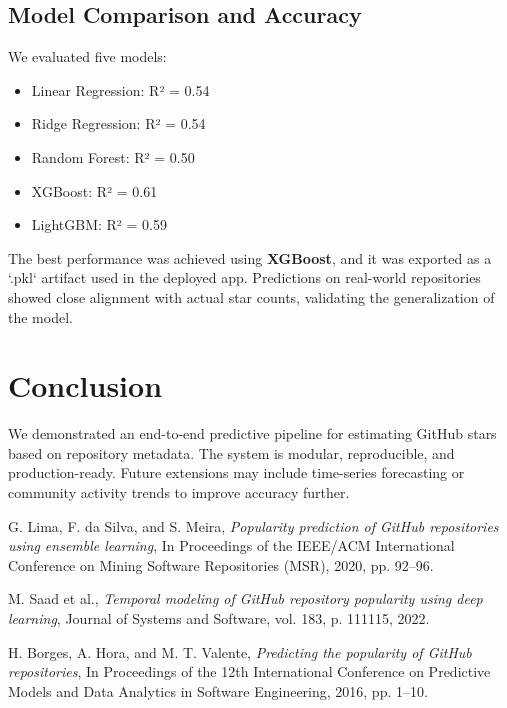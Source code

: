\documentclass[12pt,a4paper]{article}
\begin{document}
\subsection{Model Comparison and Accuracy}
We evaluated five models:
\begin{itemize}[noitemsep]
    \item Linear Regression: R² = 0.54
    \item Ridge Regression: R² = 0.54
    \item Random Forest: R² = 0.50
    \item XGBoost: R² = 0.61
    \item LightGBM: R² = 0.59
\end{itemize}

The best performance was achieved using \textbf{XGBoost}, and it was exported as a `.pkl` artifact used in the deployed app. Predictions on real-world repositories showed close alignment with actual star counts, validating the generalization of the model.

\section{Conclusion}
We demonstrated an end-to-end predictive pipeline for estimating GitHub stars based on repository metadata. The system is modular, reproducible, and production-ready. Future extensions may include time-series forecasting or community activity trends to improve accuracy further.

\begin{thebibliography}{9}

G. Lima, F. da Silva, and S. Meira,
\textit{Popularity prediction of GitHub repositories using ensemble learning},
In Proceedings of the IEEE/ACM International Conference on Mining Software Repositories (MSR), 2020, pp. 92--96.

M. Saad et al.,
\textit{Temporal modeling of GitHub repository popularity using deep learning},
Journal of Systems and Software, vol. 183, p. 111115, 2022.

H. Borges, A. Hora, and M. T. Valente,
\textit{Predicting the popularity of GitHub repositories},
In Proceedings of the 12th International Conference on Predictive Models and Data Analytics in Software Engineering, 2016, pp. 1--10.

\end{thebibliography}
\end{document}
